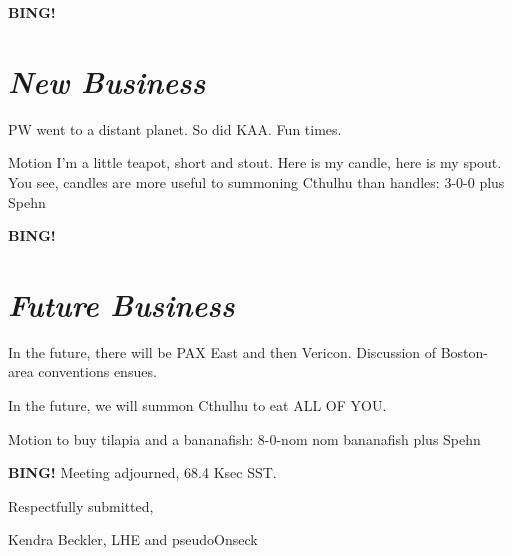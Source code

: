\documentclass[10pt]{article}
\newcommand{\bing}{{\bf BING!} }
\newcommand{\goto}[1]{\bing \vskip 12pt \section*{{\em{#1}}}}
\newcommand{\ps}{ plus Spehn\xspace}
\newcommand{\onseck}{Kendra Beckler, LHE and pseudoOnseck}
\begin{document}
\goto{New Business}

PW went to a distant planet.  So did KAA.  Fun times.

Motion I'm a little teapot, short and stout.  Here is my candle, here is my spout.  You see, candles are more useful to summoning Cthulhu than handles: 3-0-0 \ps

\goto{Future Business}

In the future, there will be PAX East and then Vericon.  Discussion of Boston-area conventions ensues.

In the future, we will summon Cthulhu to eat ALL OF YOU.

Motion to buy tilapia and a bananafish: 8-0-nom nom bananafish \ps

\bing
\noindent
Meeting adjourned, 68.4 Ksec SST.

\vspace{18pt}

\centerline{Respectfully submitted,}
\centerline{\onseck}
\end{document}
